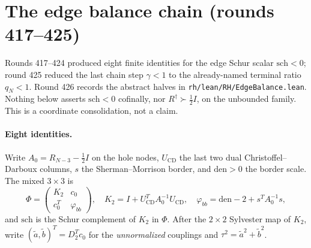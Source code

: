 \documentclass[11pt]{article}
\theoremstyle{remark}
\newcommand{\Rd}{R^{\dagger}}
\newcommand{\half}{\tfrac12}
\begin{document}
\section{The edge balance chain (rounds 417--425)}\label{sec:edgebal}

Rounds 417--424 produced eight finite identities for the edge Schur
scalar $\mathrm{sch}<0$; round 425 reduced the last chain step
$\gamma<1$ to the already-named terminal ratio $q_N<1$.  Round 426
records the abstract halves in
\texttt{rh/lean/RH/EdgeBalance.lean}.  Nothing below asserts
$\mathrm{sch}<0$ cofinally, nor $\Rd\succ\half I$, on the unbounded
family.  This is a coordinate consolidation, not a claim.

\paragraph{Eight identities.}
Write $A_0=R_{N-3}-\half I$ on the hole nodes, $U_{\mathrm{CD}}$ the
last two dual Christoffel--Darboux columns, $s$ the Sherman--Morrison
border, and $\mathrm{den}>0$ the border scale.  The mixed
$3\times 3$ is
\[
\Phi
=\begin{pmatrix} K_2 & c_0\\ c_0^T & \varphi_{bb}\end{pmatrix},
\quad
K_2=I+U_{\mathrm{CD}}^TA_0^{-1}U_{\mathrm{CD}},
\quad
\varphi_{bb}=\mathrm{den}-2+s^TA_0^{-1}s,
\]
and $\mathrm{sch}$ is the Schur complement of $K_2$ in $\Phi$.
After the $2\times 2$ Sylvester map of $K_2$, write
$(\tilde a,\tilde b)^T=D_2^Tc_0$ for the \emph{unnormalized}
couplings and $\tau^2=\tilde a^2+\tilde b^2$.
\end{document}
